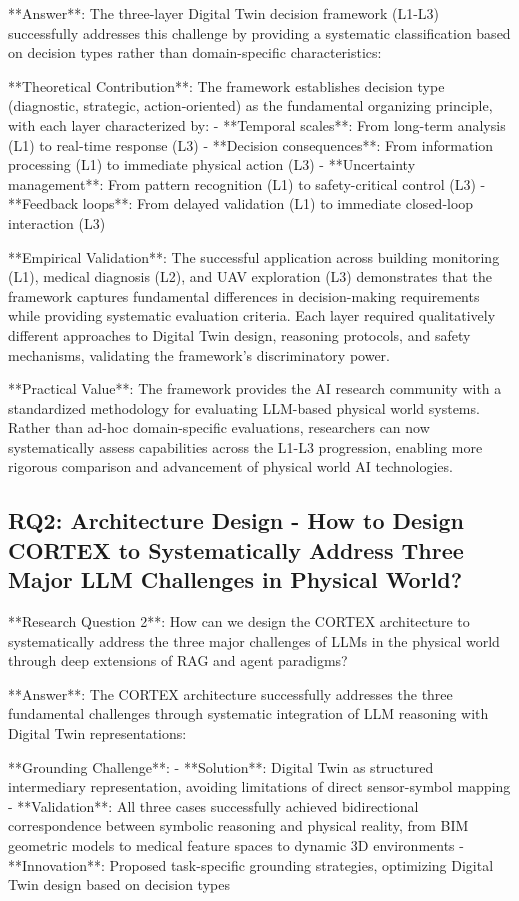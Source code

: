 **Answer**: The three-layer Digital Twin decision framework (L1-L3) successfully addresses this challenge by providing a systematic classification based on decision types rather than domain-specific characteristics:

**Theoretical Contribution**: The framework establishes decision type (diagnostic, strategic, action-oriented) as the fundamental organizing principle, with each layer characterized by:
- **Temporal scales**: From long-term analysis (L1) to real-time response (L3)
- **Decision consequences**: From information processing (L1) to immediate physical action (L3)
- **Uncertainty management**: From pattern recognition (L1) to safety-critical control (L3)
- **Feedback loops**: From delayed validation (L1) to immediate closed-loop interaction (L3)

**Empirical Validation**: The successful application across building monitoring (L1), medical diagnosis (L2), and UAV exploration (L3) demonstrates that the framework captures fundamental differences in decision-making requirements while providing systematic evaluation criteria. Each layer required qualitatively different approaches to Digital Twin design, reasoning protocols, and safety mechanisms, validating the framework's discriminatory power.

**Practical Value**: The framework provides the AI research community with a standardized methodology for evaluating LLM-based physical world systems. Rather than ad-hoc domain-specific evaluations, researchers can now systematically assess capabilities across the L1-L3 progression, enabling more rigorous comparison and advancement of physical world AI technologies.

\subsection{RQ2: Architecture Design - How to Design CORTEX to Systematically Address Three Major LLM Challenges in Physical World?}

**Research Question 2**: How can we design the CORTEX architecture to systematically address the three major challenges of LLMs in the physical world through deep extensions of RAG and agent paradigms?

**Answer**: The CORTEX architecture successfully addresses the three fundamental challenges through systematic integration of LLM reasoning with Digital Twin representations:

**Grounding Challenge**: 
- **Solution**: Digital Twin as structured intermediary representation, avoiding limitations of direct sensor-symbol mapping
- **Validation**: All three cases successfully achieved bidirectional correspondence between symbolic reasoning and physical reality, from BIM geometric models to medical feature spaces to dynamic 3D environments
- **Innovation**: Proposed task-specific grounding strategies, optimizing Digital Twin design based on decision types

